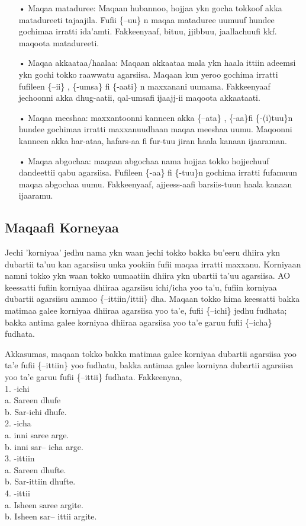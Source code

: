 \documentclass[11pt,b5paper]{book}
\begin{document}
\begin{itemize}
\item[•] Maqaa mataduree: Maqaan hubannoo, hojjaa ykn gocha tokkoof akka matadureeti tajaajila. Fufii \{–uu\} n maqaa mataduree uumuuf hundee gochimaa irratti ida'amti. Fakkeenyaaf, bituu, jjibbuu, jaallachuufi kkf. maqoota matadureeti. 

\item[•] Maqaa akkaataa/haalaa: Maqaan akkaataa mala ykn haala ittiin adeemsi ykn gochi tokko raawwatu agarsiisa. Maqaan kun yeroo gochima irratti fufileen \{–ii\} , \{-umsa\} fi \{-aati\} n maxxanani uumama. Fakkeenyaaf jechoonni akka dhug-aatii, qal-umsafi ijaajj-ii maqoota akkaataati.

\item[•] Maqaa meeshaa: maxxantoonni kanneen akka \{–ata\} , \{-aa\}fi \{-(i)tuu\}n hundee gochimaa irratti maxxanuudhaan maqaa meeshaa uumu. Maqoonni kanneen akka har-ataa, hafars-aa fi fur-tuu jiran haala kanaan ijaaraman.

\item[•] Maqaa abgochaa: maqaan abgochaa nama hojjaa tokko hojjechuuf dandeettii qabu agarsiisa. Fufileen \{-aa\} fi \{-tuu\}n gochima irratti fufamuun maqaa abgochaa uumu. Fakkeenyaaf, ajjeess-aafi barsiis-tuun haala kanaan ijaaramu.
\end{itemize}

\subsection{Maqaafi Korneyaa}

Jechi 'korniyaa' jedhu nama ykn waan jechi tokko bakka bu'eeru dhiira ykn dubartii ta'uu kan agarsiisu unka yookiin fufii maqaa irratti maxxanu. Korniyaan namni tokko ykn waan tokko uumaatiin dhiira ykn ubartii ta'uu agarsiisa. AO keessatti fufiin korniyaa dhiiraa agarsiisu ichi/icha yoo ta'u, fufiin korniyaa dubartii agarsiisu ammoo \{–ittiin/ittii\} dha. Maqaan tokko hima keessatti bakka matimaa galee korniyaa dhiiraa agarsiisa yoo ta'e, fufii \{–ichi\} jedhu fudhata; bakka antima galee korniyaa dhiiraa agarsiisa yoo ta'e garuu fufii \{–icha\} fudhata. 

Akkasumas, maqaan tokko bakka matimaa galee korniyaa dubartii agarsiisa yoo ta'e fufii \{–ittiin\} yoo fudhatu, bakka antimaa galee korniyaa dubartii agarsiisa yoo ta'e garuu fufii \{–ittii\} fudhata. Fakkeenyaa,\\
1. -ichi\\
a. Sareen dhufe\\
b. Sar-ichi dhufe.\\
2. -icha\\
a. inni saree arge.\\
b. inni sar– icha arge.\\
3. -ittiin\\
a. Sareen dhufte.\\
b. Sar-ittiin dhufte.\\
4. -ittii\\
a. Isheen saree argite.\\
b. Isheen sar– ittii argite. 
\end{document}
